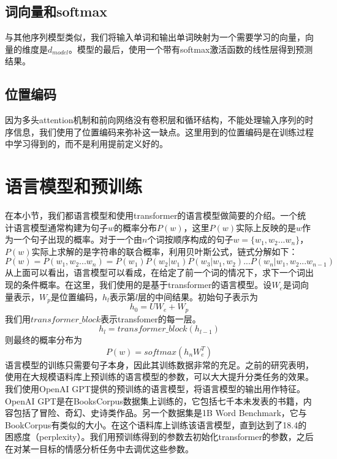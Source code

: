 \subsection{词向量和softmax}
与其他序列模型类似，我们将输入单词和输出单词映射为一个需要学习的向量，向量的维度是$d_{model}$。模型的最后，使用一个带有softmax激活函数的线性层得到预测结果。
\subsection{位置编码}
因为多头attention机制和前向网络没有卷积层和循环结构，不能处理输入序列的时序信息，我们使用了位置编码来弥补这一缺点。这里用到的位置编码是在训练过程中学习得到的，而不是利用提前定义好的\cite{radford2018improving}。
\section{语言模型和预训练}

在本小节，我们都语言模型和使用transformer的语言模型做简要的介绍。一个统计语言模型通常构建为句子$w$的概率分布$P(w)$，这里$P(w)$实际上反映的是$w$作为一个句子出现的概率。对于一个由$n$个词按顺序构成的句子$w=\{w_1,w_2...w_n\}$，$P(w)$实际上求解的是字符串的联合概率，利用贝叶斯公式，链式分解如下：
\begin{equation}
    P(w)=P(w_1,w_2...w_n)=P(w_1)P(w_2|w_1)P(w_3|w_1,w_2)...P(w_n|w_1,w_2...w_{n-1})
\end{equation}
从上面可以看出，语言模型可以看成，在给定了前一个词的情况下，求下一个词出现的条件概率。在这里，我们使用的是基于transformer的语言模型。设$W_e$是词向量表示，$W_p$是位置编码，$h_l$表示第$l$层的中间结果。初始句子表示为
\begin{equation}
    h_0=UW_e+W_p
\end{equation}
我们用$transformer\_block$表示transfomer的每一层。
\begin{equation}
    h_l=transformer\_block(h_{l-1})
\end{equation}
则最终的概率分布为
\begin{equation}
    P(w)=softmax(h_nW^T_e)
\end{equation}
语言模型的训练只需要句子本身，因此其训练数据非常的充足。之前的研究表明，使用在大规模语料库上预训练的语言模型的参数，可以大大提升分类任务的效果。我们使用OpenAI GPT\cite{radford2018improving}提供的预训练的语言模型，将语言模型的输出用作特征。OpenAI GPT是在BooksCorpus数据集上训练的，它包括七千本未发表的书籍，内容包括了冒险、奇幻、史诗类作品。另一个数据集是1B
Word Benchmark\cite{Zhu2015Aligning}，它与BookCorpus有类似的大小。在这个语料库上训练该语言模型，直到达到了18.4的困惑度（perplexity）。我们用预训练得到的参数去初始化transformer的参数，之后在对某一目标的情感分析任务中去调优这些参数。

